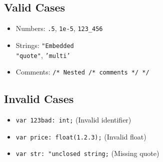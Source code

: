 \documentclass{article}
\begin{document}
\subsection{Valid Cases}
\begin{itemize}
    \item Numbers: \texttt{.5}, \texttt{1e-5}, \texttt{123\_456}
    \item Strings: \texttt{"Embedded\\"quote"}, \texttt{'multi\nline'}
    \item Comments: \texttt{/* Nested /* comments */ */}
\end{itemize}

\subsection{Invalid Cases}
\begin{itemize}
    \item \texttt{var 123bad: int;} (Invalid identifier)
    \item \texttt{var price: float(1.2.3);} (Invalid float)
    \item \texttt{var str: "unclosed string;} (Missing quote)
\end{itemize}
\end{document}
